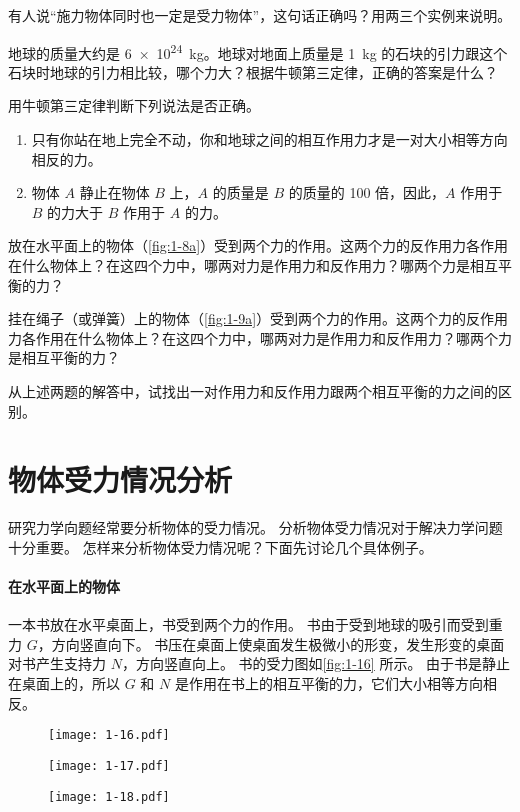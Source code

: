 \begin{Practice}
\begin{question}
\item  有人说“施力物体同时也一定是受力物体”，这句话正确吗？用两三个实例来说明。
\item  地球的质量大约是 \qty{6e24}{kg}。地球对地面上质量是 \qty{1}{kg} 的石块的引力跟这个石块时地球的引力相比较，哪个力大？根据牛顿第三定律，正确的答案是什么？
\item  用牛顿第三定律判断下列说法是否正确。
\begin{enumerate}
\item  只有你站在地上完全不动，你和地球之间的相互作用力才是一对大小相等方向相反的力。
\item  物体 $A$ 静止在物体 $B$ 上，$A$ 的质量是 $B$ 的质量的 100 倍，因此，$A$ 作用于 $B$ 的力大于 $B$ 作用于 $A$ 的力。
\end{enumerate}
\item  放在水平面上的物体（\cref{fig:1-8a}）受到两个力的作用。这两个力的反作用力各作用在什么物体上？在这四个力中，哪两对力是作用力和反作用力？哪两个力是相互平衡的力？
\item  挂在绳子（或弹簧）上的物体（\cref{fig:1-9a}）受到两个力的作用。这两个力的反作用力各作用在什么物体上？在这四个力中，哪两对力是作用力和反作用力？哪两个力是相互平衡的力？
\item 从上述两题的解答中，试找出一对作用力和反作用力跟两个相互平衡的力之间的区别。
\end{question}
\end{Practice}

\section{物体受力情况分析}
研究力学向题经常要分析物体的受力情况。
分析物体受力情况对于解决力学问题十分重要。
怎样来分析物体受力情况呢？下面先讨论几个具体例子。

\paragraph{在水平面上的物体}
一本书放在水平桌面上，书受到两个力的作用。
书由于受到地球的吸引而受到重力 $G$，方向竖直向下。
书压在桌面上使桌面发生极微小的形变，发生形变的桌面对书产生支持力 $N$，方向竖直向上。
书的受力图如\cref{fig:1-16} 所示。
由于书是静止在桌面上的，所以 $G$ 和 $N$ 是作用在书上的相互平衡的力，它们大小相等方向相反。
\begin{figure}
  \begin{minipage}[b]{0.3\linewidth}\centering
    \texttt{[image: 1-16.pdf]}
    \caption{}\label{fig:1-16}
  \end{minipage}\hfill
  \begin{minipage}[b]{0.40\linewidth}\centering
    \texttt{[image: 1-17.pdf]}
    \caption{}\label{fig:1-17}
  \end{minipage}%
  \begin{minipage}[b]{0.28\linewidth}\centering
    \texttt{[image: 1-18.pdf]}
    \caption{}\label{fig:1-18}
  \end{minipage}%
\end{figure}


